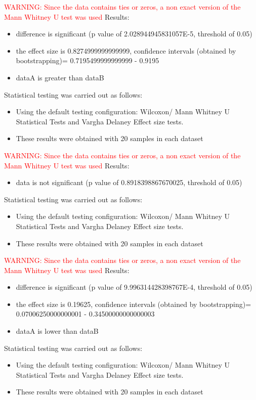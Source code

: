 \documentclass[]{article}
\begin{document}
\textcolor{Red}{WARNING: Since the data contains ties or zeros, a non exact version of the Mann Whitney U test was used
}
Results:
\begin{itemize}
\item{difference is significant (p value of 2.028944945831057E-5, threshold of 0.05)}
\item{the effect size is 0.8274999999999999, confidence intervals (obtained by bootstrapping)= 0.7195499999999999 - 0.9195}
\item{dataA is greater than dataB}
\end{itemize}Statistical testing was carried out as follows: \begin{itemize}
\item{Using the default testing configuration: Wilcoxon/ Mann Whitney U Statistical Tests and Vargha Delaney Effect size tests.}
\item{These results were obtained with 20 samples in each dataset}
\end{itemize}
\textcolor{Red}{WARNING: Since the data contains ties or zeros, a non exact version of the Mann Whitney U test was used
}
Results:
\begin{itemize}
\item{data is not significant (p value of 0.8918398867670025, threshold of 0.05)}
\end{itemize}Statistical testing was carried out as follows: \begin{itemize}
\item{Using the default testing configuration: Wilcoxon/ Mann Whitney U Statistical Tests and Vargha Delaney Effect size tests.}
\item{These results were obtained with 20 samples in each dataset}
\end{itemize}
\textcolor{Red}{WARNING: Since the data contains ties or zeros, a non exact version of the Mann Whitney U test was used
}
Results:
\begin{itemize}
\item{difference is significant (p value of 9.996314428398767E-4, threshold of 0.05)}
\item{the effect size is 0.19625, confidence intervals (obtained by bootstrapping)= 0.07006250000000001 - 0.34500000000000003}
\item{dataA is lower than dataB}
\end{itemize}Statistical testing was carried out as follows: \begin{itemize}
\item{Using the default testing configuration: Wilcoxon/ Mann Whitney U Statistical Tests and Vargha Delaney Effect size tests.}
\item{These results were obtained with 20 samples in each dataset}
\end{itemize}
\end{document}
